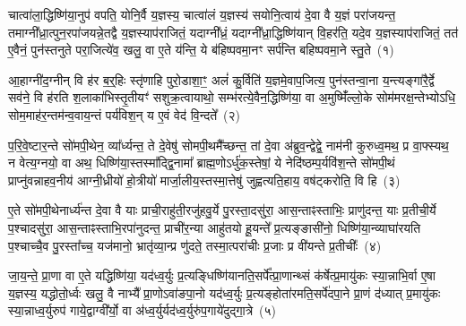 {}%


{\anuvakamend[{चात्वा॑लाथ्सुव॒र्गाय॒ यद्वै॑सर्ज॒नानि॑ वैष्ण॒व्यर्चा पृ॑थि॒व्यै सा॒ध्या इ॒षे त्वेत्य॒ग्निना॒ पर्य॑ग्नि प॒शोः प॒शुमा॒लभ्य॒ मेद॑सा॒ स्रुचा॒वेका॑\-दश}]}%
{}

\setcounter{anuvakam}{0}
चात्वा॑ला॒द्धिष्णि॑या॒नुप॑ वपति॒ योनि॒र्वै य॒ज्ञस्य॒ चात्वा॑लं य॒ज्ञस्य॑ सयोनि॒त्वाय॑ दे॒वा वै य॒ज्ञं परा॑जयन्त॒ तमाग्नी᳚ध्रा॒त्पुन॒रपा॑जयन्ने॒तद्वै य॒ज्ञस्याप॑राजितं॒ यदाग्नी᳚ध्रं॒ यदाग्नी᳚ध्रा॒द्धिष्णि॑यान् वि॒हर॑ति॒ यदे॒व य॒ज्ञस्याप॑राजितं॒ तत॑ ए॒वैनं॒ पुन॑स्तनुते परा॒जित्ये॑व॒ खलु॒ वा ए॒ते य॑न्ति॒ ये ब॑हिष्पवमा॒नꣳ सर्प॑न्ति बहिष्पवमा॒ने स्तु॒ते~(१)

आ॒हाग्नी॑द॒ग्नीन् वि ह॑र ब॒र्॒\mbox{}हिः स्तृ॑णाहि पुरो॒डाशा॒ꣳ॒ अलं॑ कु॒र्विति॑ य॒ज्ञमे॒वाप॒जित्य॒ पुन॑स्तन्वा॒ना य॒न्त्यङ्गा॑रै॒र्द्वे सव॑ने॒ वि ह॑रति श॒लाका॑भिस्तृ॒तीयꣳ॑ सशुक्र॒त्वायाथो॒ सम्भ॑रत्ये॒वैन॒द्धिष्णि॑या॒ वा अ॒मुष्मिँ॑ल्लो॒के सोम॑मरक्ष॒न्तेभ्यो\-ऽधि॒ सोम॒माह॑र॒न्तम॑न्व॒वाय॒न्तं पर्य॑विश॒न् य ए॒वं वेद॑ वि॒न्दते᳚~(२)

प॒रि॒वे॒ष्टार॒न्ते सो॑मपी॒थेन॒ व्या᳚र्ध्यन्त॒ ते दे॒वेषु॑ सोमपी॒थमै᳚च्छन्त॒ तां दे॒वा अ॑ब्रुव॒न्द्वेद्वे॒ नाम॑नी कुरुध्व॒मथ॒ प्र वा॒फ्स्यथ॒ न वेत्य॒ग्नयो॒ वा अथ॒ धिष्णि॑या॒स्तस्मा᳚द्द्वि॒नामा᳚ ब्राह्म॒णो\-ऽर्धु॑क॒स्तेषां॒ ये नेदि॑ष्ठम्प॒र्यवि॑श॒न्ते सो॑मपी॒थं प्राप्नु॑वन्नाहव॒नीय॑ आग्नी॒ध्रीयो॑ हो॒त्रीयो॑ मार्जा॒लीय॒स्तस्मा॒त्तेषु॑ जुह्वत्यति॒हाय॒ वष॑ट्करोति॒ वि हि~(३)

ए॒ते सो॑मपी॒थेनार्ध्य॑न्त दे॒वा वै याः प्राची॒राहु॑ती॒रजु॑हवु॒र्ये पु॒रस्ता॒दसु॑रा॒ आस॒न्ताꣴस्ताभिः॒ प्राणु॑दन्त॒ याः प्र॒तीची॒र्ये प॒श्चादसु॑रा॒ आस॒न्ताꣴस्ताभि॒रपा॑नुदन्त॒ प्राची॑र॒न्या आहु॑तयो हू॒यन्ते᳚ प्र॒त्यङ्ङासी॑नो॒ धिष्णि॑या॒न्व्याघा॑रयति प॒श्चाच्चै॒व पु॒रस्ता᳚च्च॒ यज॑मानो॒ भ्रातृ॑व्या॒न्प्र णु॑दते॒ तस्मा॒त्परा॑चीः प्र॒जाः प्र वी॑यन्ते प्र॒तीचीः᳚~(४)

जा॒य॒न्ते॒ प्रा॒णा वा ए॒ते यद्धिष्णि॑या॒ यद॑ध्व॒र्युः प्र॒त्यङ्धिष्णि॑यानति॒सर्पे᳚त्प्रा॒णान्थ्सं क॑र्\mbox{}षेत्प्र॒मायु॑कः स्या॒न्नाभि॒र्वा ए॒षा य॒ज्ञस्य॒ यद्धोतो॒र्ध्वः खलु॒ वै नाभ्यै᳚ प्रा॒णो\-ऽवा॑ङपा॒नो यद॑ध्व॒र्युः प्र॒त्यङ्होता॑रमति॒सर्पे॑दपा॒ने प्रा॒णं द॑ध्यात् प्र॒मायु॑कः स्या॒न्नाध्व॒र्युरुप॑ गाये॒द्वाग्वी᳚र्यो॒ वा अ॑ध्व॒र्युर्यद॑ध्व॒र्युरु॑प॒गाये॑दुद्गा॒त्रे~(५)

